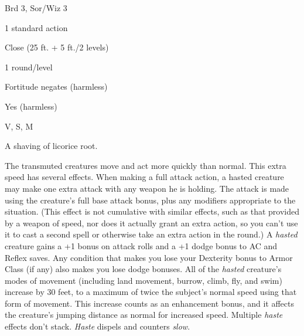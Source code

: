 
\begin{description*}
\item[Level:] Brd 3, Sor/Wiz 3
\item[Casting Time:] 1 standard action
\item[Range:] Close (25 ft. + 5 ft./2 levels)
\item[Duration:] 1 round/level
\item[Saving Throw:] Fortitude negates (harmless)
\item[Spell Resistance:] Yes (harmless)
\item[Components:] V, S, M
\item[Arcane Material Component:] A shaving of licorice root.
\end{description*}

The transmuted creatures move and act more quickly than normal. This extra speed
has several effects.
When making a full attack action, a hasted creature may make one extra attack with
any weapon he is holding. The attack is made using the creature's full base attack
bonus, plus any modifiers appropriate to the situation. (This effect is not cumulative
with similar effects, such as that provided by a weapon of speed, nor does it actually
grant an extra action, so you can't use it to cast a second spell or otherwise
take an extra action in the round.)
A \textit{hasted} creature gains a +1 bonus on attack rolls and a +1 dodge bonus
to AC and Reflex saves. Any condition that makes you lose your Dexterity bonus
to Armor Class (if any) also makes you lose dodge bonuses.
All of the \textit{hasted} creature's modes of movement (including land movement,
burrow, climb, fly, and swim) increase by 30 feet, to a maximum of twice the subject's
normal speed using that form of movement. This increase counts as an enhancement
bonus, and it affects the creature's jumping distance as normal for increased speed.
Multiple \textit{haste} effects don't stack. \textit{Haste} dispels and counters
\textit{slow}.